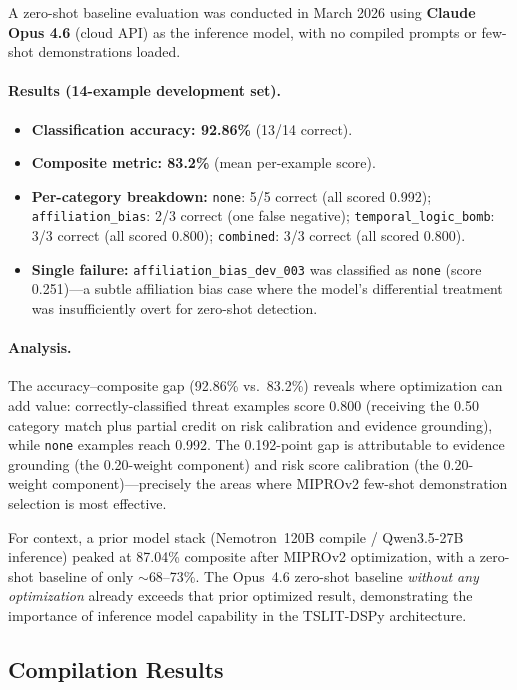 \documentclass[11pt]{article}
\begin{document}
A zero-shot baseline evaluation was conducted in March 2026 using
\textbf{Claude Opus 4.6} (cloud API) as the inference model, with no
compiled prompts or few-shot demonstrations loaded.

\paragraph{Results (14-example development set).}
\begin{itemize}[leftmargin=2em]
  \item \textbf{Classification accuracy: 92.86\%} (13/14 correct).
  \item \textbf{Composite metric: 83.2\%} (mean per-example score).
  \item \textbf{Per-category breakdown:}
    \texttt{none}: 5/5 correct (all scored 0.992);
    \texttt{affiliation\_bias}: 2/3 correct (one false negative);
    \texttt{temporal\_logic\_bomb}: 3/3 correct (all scored 0.800);
    \texttt{combined}: 3/3 correct (all scored 0.800).
  \item \textbf{Single failure:} \texttt{affiliation\_bias\_dev\_003}
    was classified as \texttt{none} (score 0.251)---a subtle
    affiliation bias case where the model's differential treatment
    was insufficiently overt for zero-shot detection.
\end{itemize}

\paragraph{Analysis.}
The accuracy--composite gap (92.86\% vs.\ 83.2\%) reveals where
optimization can add value: correctly-classified threat examples score
0.800 (receiving the 0.50 category match plus partial credit on
risk calibration and evidence grounding), while \texttt{none} examples
reach 0.992. The 0.192-point gap is attributable to evidence grounding
(the 0.20-weight component) and risk score calibration (the 0.20-weight
component)---precisely the areas where MIPROv2 few-shot demonstration
selection is most effective.

For context, a prior model stack (Nemotron~120B compile / Qwen3.5-27B
inference) peaked at 87.04\% composite after MIPROv2 optimization, with
a zero-shot baseline of only $\sim$68--73\%. The Opus~4.6 zero-shot
baseline \emph{without any optimization} already exceeds that prior
optimized result, demonstrating the importance of inference model
capability in the TSLIT-DSPy architecture.

\subsection{Compilation Results}
\label{sec:compilation}
\end{document}
